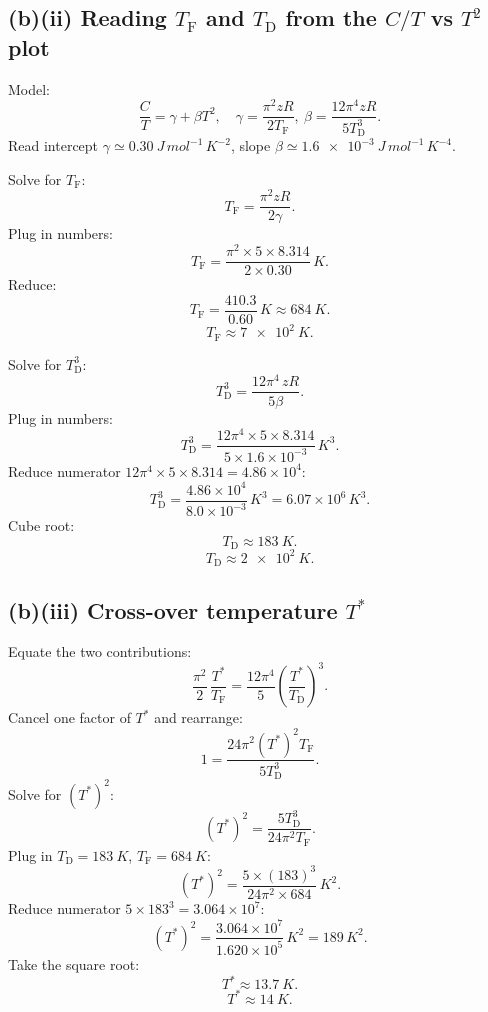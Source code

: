 \documentclass[11pt]{article}
\newcommand{\TF}{T_{\mathrm{F}}}
\newcommand{\TD}{T_{\mathrm{D}}}
\begin{document}
\subsection*{(b)(ii) Reading $\TF$ and $\TD$ from the $C/T$ vs $T^2$ plot}

Model:
\begin{equation}
\frac{C}{T} = \gamma + \beta T^2,\quad \gamma=\frac{\pi^2 z R}{2\TF},\ \beta=\frac{12\pi^4 zR}{5\TD^3}.
\label{eq:CTline}
\end{equation}
Read intercept $\gamma\simeq\SI{0.30}{J\,mol^{-1}\,K^{-2}}$, slope $\beta\simeq \SI{1.6e-3}{J\,mol^{-1}\,K^{-4}}$.

Solve for $\TF$:
\[
\TF = \frac{\pi^2 zR}{2\gamma}.
\]
Plug in numbers:
\[
\TF = \frac{\pi^2\times 5\times 8.314}{2\times 0.30}\,\si{K}.
\]
Reduce:
\[
\TF = \frac{410.3}{0.60}\,\si{K} \approx \SI{684}{K}.
\]
\begin{equation}
\boxed{\ \TF \approx \SI{7e2}{K}.\ }
\label{eq:TFbox}
\end{equation}

Solve for $\TD^3$:
\[
\TD^3 = \frac{12\pi^4\,zR}{5\beta}.
\]
Plug in numbers:
\[
\TD^3 = \frac{12\pi^4\times 5\times 8.314}{5\times 1.6\times 10^{-3}}\,\si{K^3}.
\]
Reduce numerator $12\pi^4 \times 5 \times 8.314 = 4.86\times 10^4$:
\[
\TD^3 = \frac{4.86\times 10^4}{8.0\times 10^{-3}}\,\si{K^3} = 6.07\times 10^6\,\si{K^3}.
\]
Cube root:
\[
\TD \approx \SI{183}{K}.
\]
\begin{equation}
\boxed{\ \TD \approx \SI{2e2}{K}.\ }
\label{eq:TDbox}
\end{equation}

\subsection*{(b)(iii) Cross-over temperature $T^\ast$}

Equate the two contributions:
\[
\frac{\pi^2}{2}\,\frac{T^*}{\TF} = \frac{12\pi^4}{5}\!\left(\frac{T^*}{\TD}\right)^3.
\]
Cancel one factor of $T^*$ and rearrange:
\[
1 = \frac{24\pi^2 (T^*)^2 \TF}{5\TD^3}.
\]
Solve for $(T^*)^2$:
\[
(T^*)^2 = \frac{5\TD^3}{24\pi^2 \TF}.
\]
Plug in $\TD=\SI{183}{K}$, $\TF=\SI{684}{K}$:
\[
(T^*)^2 = \frac{5\times (183)^3}{24\pi^2\times 684}\,\si{K^2}.
\]
Reduce numerator $5\times 183^3 = 3.064\times 10^7$:
\[
(T^*)^2 = \frac{3.064\times 10^7}{1.620\times 10^5}\,\si{K^2} = 189\,\si{K^2}.
\]
Take the square root:
\[
T^* \approx \SI{13.7}{K}.
\]
\begin{equation}
\boxed{\ T^* \approx \SI{14}{K}.\ }
\label{eq:Tstarbox}
\end{equation}
\end{document}
